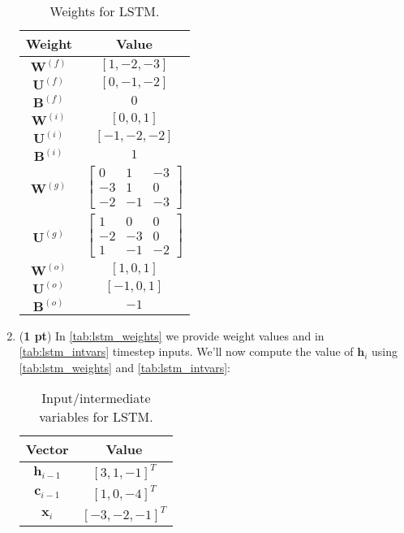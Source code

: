 \documentclass[11pt, letterpaper]{article}
\begin{document}
\begin{enumerate}[label=(\alph*)]

\begin{table}[h]
    \centering
    \begin{tabular}{|cc|}
    \toprule
    \textbf{Weight} & \textbf{Value} \\
    \midrule
    $\mathbf{W}^{(f)}$ & $[1,-2,-3]$ \\
    $\mathbf{U}^{(f)}$ & $[0,-1,-2]$ \\
    $\mathbf{B}^{(f)}$ & $0$ \\
    $\mathbf{W}^{(i)}$ & $[0,0,1]$\\
    $\mathbf{U}^{(i)}$ & $[-1,-2,-2]$\\
    $\mathbf{B}^{(i)}$ & $1$ \\
    $\mathbf{W}^{(g)}$ & $\begin{bmatrix}
    0 & 1 & -3\\
    -3 & 1 & 0\\
    -2 & -1 & -3
        \end{bmatrix}$ \\
    $\mathbf{U}^{(g)}$ & $\begin{bmatrix}
    1 & 0 & 0 \\
    -2 & -3 & 0\\
    1 & -1 & -2 \end{bmatrix}$ \\
    $\mathbf{W}^{(o)}$ & $[1,0,1]$\\
    $\mathbf{U}^{(o)}$ & $[-1,0,1]$\\
    $\mathbf{B}^{(o)}$ & $-1$ \\
    \bottomrule
    \end{tabular}
    \caption{Weights for LSTM.}
    \label{tab:lstm_weights}
\end{table}

\newpage

\item (\textbf{1 pt}) In \autoref{tab:lstm_weights} we provide weight values and in \autoref{tab:lstm_intvars} timestep inputs. We'll now compute the value of $\boldsymbol{h}_{i}$ using \autoref{tab:lstm_weights} and \autoref{tab:lstm_intvars}: 

\begin{table}[h!]
    \centering
    \begin{tabular}{|cc|}
    \toprule
    \textbf{Vector} & \textbf{Value} \\
    \midrule
    $\boldsymbol{h}_{i-1}$ & $[3,1,-1]^T$ \\
    $\boldsymbol{c}_{i-1}$ & $[1,0,-4]^T$ \\
    $\boldsymbol{x}_{i}$ & $[-3,-2,-1]^T$ \\
    \bottomrule
    \end{tabular}
    \caption{Input/intermediate variables for LSTM.}
    \label{tab:lstm_intvars}
\end{table}



\end{enumerate}
\end{document}
